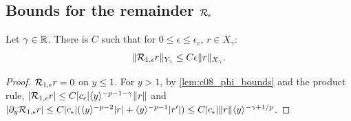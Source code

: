 \subsection{Bounds for the remainder $\mathcal{R}_\epsilon$}

\begin{lemma}[$\mc R_{1,\epsilon}$]
  \label{lem:c08_R1_bound}
  Let $\gamma\in\mathbb{R}$. There is $C$ such that for $0\le\epsilon\le\epsilon_c$, $r\in X_\gamma$:
  \begin{equation}\label{eqn:linear_R1_bound}
    \|\mathcal{R}_{1,\epsilon}r\|_{Y_\gamma}\le C\epsilon\|r\|_{X_\gamma}.
  \end{equation}
\end{lemma}
\begin{proof}
  $\mathcal{R}_{1,\epsilon}r=0$ on $y\le1$. For $y>1$, by \cref{lem:c08_phi_bounds} and the product rule,
  $|\mathcal{R}_{1,\epsilon}r|\le C|c_\epsilon|\langle y \rangle^{-p-1-\gamma}\|r\|$ and
  $|\partial_y\mathcal{R}_{1,\epsilon}r|\le C|c_\epsilon|(\langle y \rangle^{-p-2}|r|+\langle y \rangle^{-p-1}|r'|)\le C|c_\epsilon|\|r\|\langle y \rangle^{-\gamma+1/p}$.
\end{proof}

